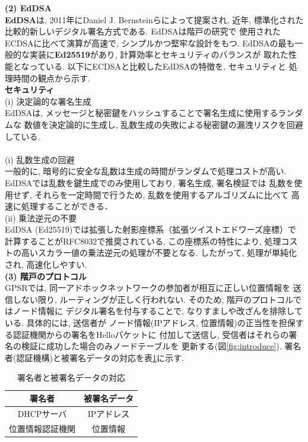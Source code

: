 \documentclass[a4j,9pt,twocolumn]{jsarticle}
\begin{document}
\noindent\textbf{(2) EdDSA}\\
\indent \textbf{EdDSA}は,  2011年にDaniel J. Bernsteinらによって提案され, 
近年, 標準化された比較的新しいデジタル署名方式である\cite{eddsa}. EdDSAは階戸の研究で
使用されたECDSAに比べて演算が高速で, シンプルかつ堅牢な設計をもつ. 
EdDSAの最も一般的な実装に\textbf{Ed25519}があり, 計算効率とセキュリティのバランスが
取れた性能となっている. 以下にECDSAと比較したEdDSAの特徴を, セキュリティと
処理時間の観点から示す.\\
\noindent \textbf{セキュリティ}\\
(i) 決定論的な署名生成\\
\indent EdDSAは, メッセージと秘密鍵をハッシュすることで署名生成に使用するランダムな
数値を決定論的に生成し, 乱数生成の失敗による秘密鍵の漏洩リスクを回避している.\\
\\
(i) 乱数生成の回避 \\
\indent 一般的に, 暗号的に安全な乱数は生成の時間がランダムで処理コストが高い. 
EdDSAでは乱数を鍵生成でのみ使用しており, 署名生成, 署名検証では
乱数を使用せず, それらを一定時間で行うため, 乱数を使用するアルゴリズムに比べて
高速に処理することができる．\\
(ii) 乗法逆元の不要\\
\indent EdDSA (Ed25519)では拡張した射影座標系（拡張ツイストエドワーズ座標）で
計算することがRFC8032で推奨されている\cite{8032}. 
この座標系の特性により, 処理コストの高いスカラー値の乗法逆元の処理が不要となる. 
したがって, 処理が単純化され,  高速化しやすい.\\[2mm]
\noindent\textbf{(3) 階戸のプロトコル}\\
\indent GPSRでは, 同一アドホックネットワークの参加者が相互に正しい位置情報を
送信しない限り, ルーティングが正しく行われない. そのため, 階戸のプロトコルではノード情報に
デジタル署名を付与することで, なりすましや改ざんを排除している. 具体的には, 送信者が
ノード情報(IPアドレス, 位置情報)の正当性を担保する認証機関からの署名をHelloパケットに
付加して送信し, 受信者はそれらの署名の検証に成功した場合のみノードテーブルを
更新する(図\ref{fig:introduce}). 
署名者(認証機構)と被署名データの対応を表\ref{tab:sign}に示す. 
\vspace{-3mm}
\begin{table}[h]
    \centering
    \caption{署名者と被署名データの対応\cite{shinato}}
    \label{tab:sign}
    \begin{tabular}{cc} \hline
        署名者 & 被署名データ \\ \hline \hline
        DHCPサーバ & IPアドレス \\
        位置情報認証機関 & 位置情報 \\ \hline
    \end{tabular}
\end{table}
\end{document}

